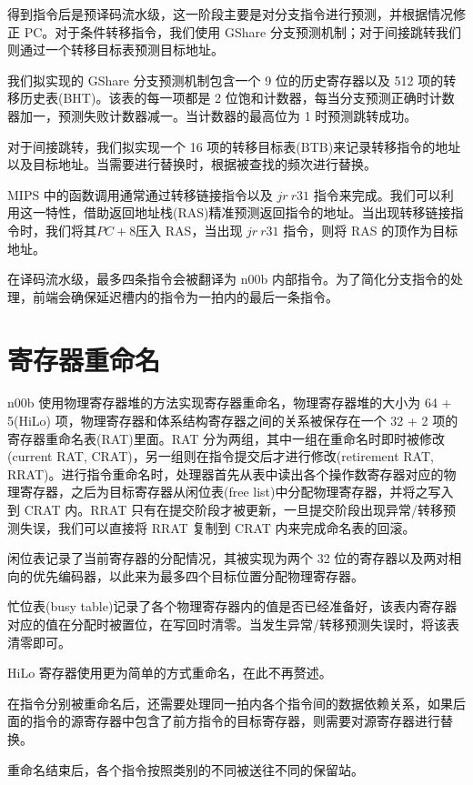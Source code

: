 \documentclass[blue,normal,cn]{elegantnote}
\begin{document}
得到指令后是预译码流水级，这一阶段主要是对分支指令进行预测，并根据情况修正 PC。对于条件转移指令，我们使用 GShare 分支预测机制；对于间接跳转我们则通过一个转移目标表预测目标地址。

我们拟实现的 GShare 分支预测机制包含一个 9 位的历史寄存器以及 512 项的转移历史表(BHT)。该表的每一项都是 2 位饱和计数器，每当分支预测正确时计数器加一，预测失败计数器减一。当计数器的最高位为 1 时预测跳转成功。

对于间接跳转，我们拟实现一个 16 项的转移目标表(BTB)来记录转移指令的地址以及目标地址。当需要进行替换时，根据被查找的频次进行替换。

MIPS 中的函数调用通常通过转移链接指令以及 $jr\ r31$ 指令来完成。我们可以利用这一特性，借助返回地址栈(RAS)精准预测返回指令的地址。当出现转移链接指令时，我们将其$PC + 8$压入 RAS，当出现 $jr\ r31$ 指令，则将 RAS 的顶作为目标地址。

在译码流水级，最多四条指令会被翻译为 n00b 内部指令。为了简化分支指令的处理，前端会确保延迟槽内的指令为一拍内的最后一条指令。

\section{寄存器重命名}

n00b 使用物理寄存器堆的方法实现寄存器重命名，物理寄存器堆的大小为 64 + 5(HiLo) 项，物理寄存器和体系结构寄存器之间的关系被保存在一个 32 + 2 项的寄存器重命名表(RAT)里面。RAT 分为两组，其中一组在重命名时即时被修改(current RAT, CRAT)，另一组则在指令提交后才进行修改(retirement RAT, RRAT)。进行指令重命名时，处理器首先从表中读出各个操作数寄存器对应的物理寄存器，之后为目标寄存器从闲位表(free list)中分配物理寄存器，并将之写入到 CRAT 内。RRAT 只有在提交阶段才被更新，一旦提交阶段出现异常/转移预测失误，我们可以直接将 RRAT 复制到 CRAT 内来完成命名表的回滚。

闲位表记录了当前寄存器的分配情况，其被实现为两个 32 位的寄存器以及两对相向的优先编码器，以此来为最多四个目标位置分配物理寄存器。

忙位表(busy table)记录了各个物理寄存器内的值是否已经准备好，该表内寄存器对应的值在分配时被置位，在写回时清零。当发生异常/转移预测失误时，将该表清零即可。

HiLo 寄存器使用更为简单的方式重命名，在此不再赘述。

在指令分别被重命名后，还需要处理同一拍内各个指令间的数据依赖关系，如果后面的指令的源寄存器中包含了前方指令的目标寄存器，则需要对源寄存器进行替换。

重命名结束后，各个指令按照类别的不同被送往不同的保留站。
\end{document}

